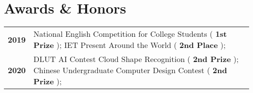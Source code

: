 \documentclass[a4,10pt]{article}
\newenvironment{zitemize}{
\begin{itemize}\itemsep0pt \parskip0pt \parsep1pt}
{\end{itemize}\vspace{-0.5cm}}
\newcommand{\hskills}[1]{
\textbf{\bfseries #1} }
\begin{document}








\section{Awards \& Honors}
\vspace{-0.2cm}
\begin{tabular}[t]{ p{4em} p{50em}}
\hskills{2019} & National English Competition for College Students (\hskills{1st Prize}); IET Present Around the World (\hskills{2nd Place}); \\ %
\hskills{2020} & DLUT AI Contest Cloud Shape Recognition (\hskills{2nd Prize}); Chinese Undergraduate Computer Design Contest (\hskills{2nd Prize});\\
\end{tabular} 

\end{document}
